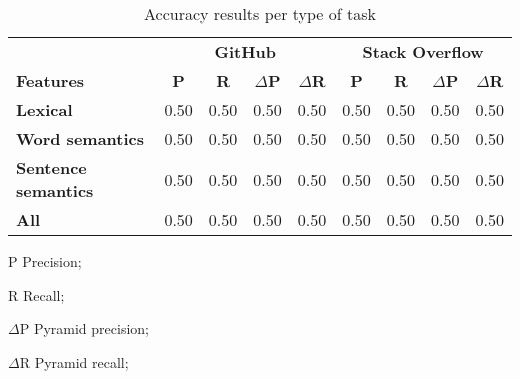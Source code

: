 \begin{table}[H]
\centering    
\begin{scriptsize}
\begin{threeparttable}
\begin{tabular}{lcccccccc}




& \multicolumn{4}{c}{\textbf{GitHub}}
& \multicolumn{4}{c}{\textbf{Stack Overflow}}
\\ \cmidrule(l){2-5} \cmidrule(l){6-9}    


\textbf{Features} & 
\textbf{P} & \textbf{R} & $\Delta$\textbf{P} &  $\Delta$\textbf{R} &
\textbf{P} & \textbf{R} & $\Delta$\textbf{P} &  $\Delta$\textbf{R} \\


\hline

\textbf{Lexical} &
0.50 & 0.50 & 0.50 & 0.50 &
0.50 & 0.50 & 0.50 & 0.50 
\\

\textbf{Word semantics} &
0.50 & 0.50 & 0.50 & 0.50 &
0.50 & 0.50 & 0.50 & 0.50 
\\

\textbf{Sentence semantics} &
0.50 & 0.50 & 0.50 & 0.50 &
0.50 & 0.50 & 0.50 & 0.50 
\\

\hline
\textbf{All} &
0.50 & 0.50 & 0.50 & 0.50 &
0.50 & 0.50 & 0.50 & 0.50 
\\
\hline

\end{tabular}
\begin{tablenotes}
    \item[P] Precision; 
    \item[R] Recall;
    \item[$\Delta$P] Pyramid precision; 
    \item[$\Delta$R] Pyramid recall;
\end{tablenotes}
\end{threeparttable}
\end{scriptsize}
\caption{Accuracy results per type of task}
\label{tbl:approach-results-task}
\end{table}

